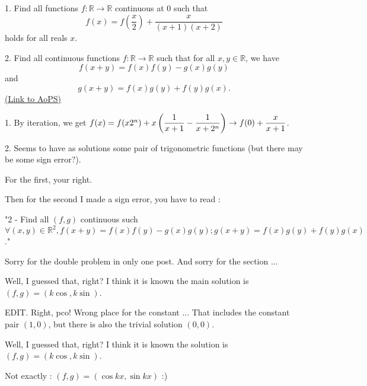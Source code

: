 \begin{problem}
	1. Find all functions $f:\mathbb{R} \to \mathbb{R}$ continuous at $0$ such that \[f(x)=f \left( \frac{x}{2}\right)+\frac{x}{(x+1)(x+2)}\] holds for all reals $x$. 

2. Find all continuous functions $f: \mathbb R \to \mathbb R$ such that for all $x, y \in \mathbb R$, we have \[f(x+y)=f(x)f(y)-g(x)g(y)\] and \[ g(x+y)=f(x)g(y)+f(y)g(x).\]
	\flushright \href{https://artofproblemsolving.com/community/c6h398607}{(Link to AoPS)}
\end{problem}



\begin{solution}
	1. By iteration, we get $f(x) = f(x\/2^n) + x\left (\dfrac {1} {x+1} - \dfrac {1} {x+2^n} \right ) \to f(0) + \dfrac {x} {x+1}$.

2. Seems to have as solutions some pair of trigonometric functions (but there may be some sign error?).
\end{solution}



\begin{solution}
	For the first, your right. 

Then for the second I made a sign error, you have to read :

"2 - Find all $(f,g)$ continuous such $\forall (x,y)\in \mathbb{R}^2, f(x+y)=f(x)f(y)-g(x)g(y) ; g(x+y)=f(x)g(y)+f(y)g(x)$."

Sorry for the double problem in only one post. And sorry for the section ...
\end{solution}



\begin{solution}
	Well, I guessed that, right? I think it is known the main solution is $(f,g) = (k\cos,k\sin)$.

EDIT. Right, pco! Wrong place for the constant ... That includes the constant pair $(1,0)$, but there is also the trivial solution $(0,0)$.
\end{solution}



\begin{solution}
	\begin{tcolorbox}Well, I guessed that, right? I think it is known the solution is $(f,g) = (k\cos,k\sin)$.\end{tcolorbox}

Not exactly : $(f,g) = (\cos kx, \sin kx)$ :)
\end{solution}



